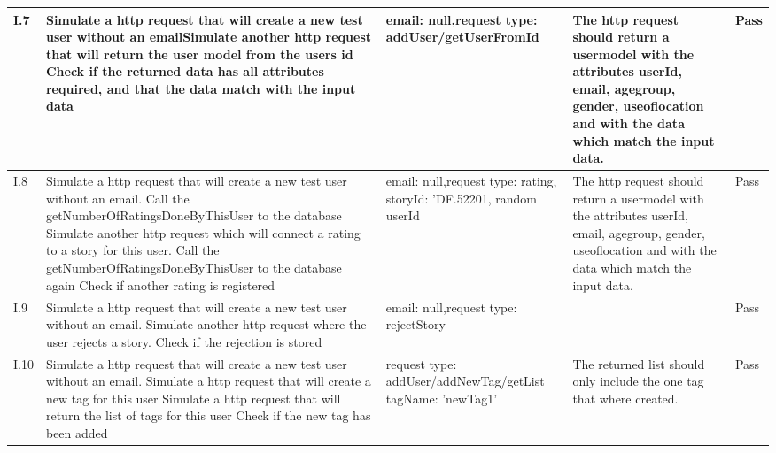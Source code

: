 {{\begin{longtable}{| p{1cm} | p{5.5cm} | p{3cm} | p{5.5cm} | p{2cm} |}
			I.7 & Simulate a http request that will create a new test user without an email\newline  Simulate another http request that will return the user model from the users id \newline Check if the returned data has all attributes required, and that the data match with the input data & email: null,\newline request type: addUser/getUserFromId  & The http request should return a usermodel with the attributes userId, email, age\textunderscore group, gender, use\textunderscore of\textunderscore location and with the data which match the input data. & Pass\\ \hline
			
			I.8 & Simulate a http request that will create a new test user without an email. \newline Call the getNumberOfRatingsDoneByThisUser to the database \newline  Simulate another http request which will connect a rating to a story for this user.  \newline Call the getNumberOfRatingsDoneByThisUser to the database again \newline Check if another rating is registered & email: null,\newline request type: rating, storyId: 'DF.52201, random userId  & The http request should return a usermodel with the attributes userId, email, age\textunderscore group, gender, use\textunderscore of\textunderscore location and with the data which match the input data. & Pass \\ \hline
			
			I.9 & Simulate a http request that will create a new test user without an email. \newline  \newline  Simulate another http request where the user rejects a story.  \newline  \newline Check if the rejection is stored & email: null,\newline request type: rejectStory  &  & Pass \\ \hline

			I.10 & Simulate a http request that will create a new test user without an email. \newline  Simulate a http request that will create a new tag for this user \newline Simulate a http request that will return the list of tags for this user \newline Check if the new tag has been added  & request type: addUser/addNewTag/getList  tagName: 'newTag1' & The returned list should only include the one tag that where created.& Pass\\ \hline
			

\end{longtable}}}
